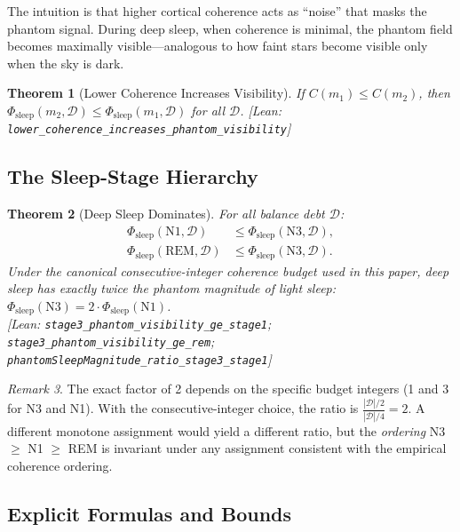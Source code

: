 \documentclass[11pt, a4paper]{article}
\newcommand{\leanref}[1]{\texttt{\small #1}}
\newtheorem{theorem}{Theorem}[section]
\theoremstyle{definition}
\theoremstyle{remark}
\newtheorem{remark}[theorem]{Remark}
\begin{document}
The intuition is that higher cortical coherence acts as ``noise''
that masks the phantom signal. During deep sleep, when coherence
is minimal, the phantom field becomes maximally visible---analogous
to how faint stars become visible only when the sky is dark.

\begin{theorem}[Lower Coherence Increases Visibility]\label{thm:visibility}
If $C(m_1) \leq C(m_2)$, then
$\Phi_{\mathrm{sleep}}(m_2, \mathcal{D}) \leq
\Phi_{\mathrm{sleep}}(m_1, \mathcal{D})$ for all $\mathcal{D}$.
\textup{[Lean: \leanref{lower\_coherence\_increases\_phantom\_visibility}]}
\end{theorem}

\subsection{The Sleep-Stage Hierarchy}

\begin{theorem}[Deep Sleep Dominates]\label{thm:stage3}
For all balance debt $\mathcal{D}$:
\begin{align}
\Phi_{\mathrm{sleep}}(\mathrm{N1}, \mathcal{D})
&\leq \Phi_{\mathrm{sleep}}(\mathrm{N3}, \mathcal{D}),
\label{eq:stage3-ge-stage1} \\
\Phi_{\mathrm{sleep}}(\mathrm{REM}, \mathcal{D})
&\leq \Phi_{\mathrm{sleep}}(\mathrm{N3}, \mathcal{D}).
\label{eq:stage3-ge-rem}
\end{align}
Under the canonical consecutive-integer coherence budget used in this
paper, deep sleep has exactly twice the phantom magnitude of light
sleep: $\Phi_{\mathrm{sleep}}(\mathrm{N3}) = 2 \cdot
\Phi_{\mathrm{sleep}}(\mathrm{N1})$.\\
\textup{[Lean:
\leanref{stage3\_phantom\_visibility\_ge\_stage1};
\leanref{stage3\_phantom\_visibility\_ge\_rem};
\leanref{phantomSleepMagnitude\_ratio\_stage3\_stage1}]}
\end{theorem}

\begin{remark}
The exact factor of 2 depends on the specific budget integers
(1 and 3 for N3 and N1). With the consecutive-integer choice, the
ratio is $\frac{|\mathcal{D}|/2}{|\mathcal{D}|/4} = 2$. A
different monotone assignment would yield a different ratio, but
the \emph{ordering} N3 $\geq$ N1 $\geq$ REM is invariant under
any assignment consistent with the empirical coherence ordering.
\end{remark}

\subsection{Explicit Formulas and Bounds}
\end{document}
